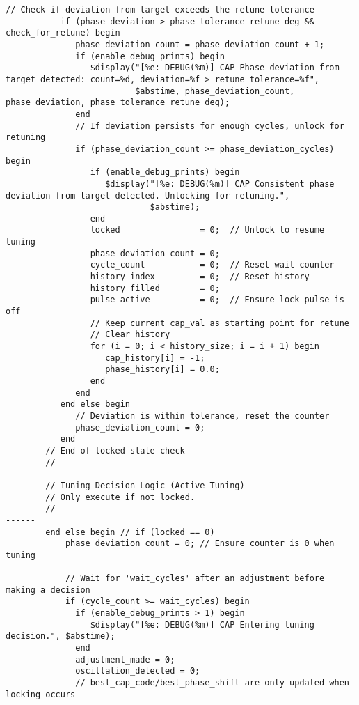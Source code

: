 \begin{lstlisting}[caption={Verilog-A Generic Capacitor Tuner Implementation}]
           // Check if deviation from target exceeds the retune tolerance
           if (phase_deviation > phase_tolerance_retune_deg && check_for_retune) begin
              phase_deviation_count = phase_deviation_count + 1;
              if (enable_debug_prints) begin
                 $display("[%e: DEBUG(%m)] CAP Phase deviation from target detected: count=%d, deviation=%f > retune_tolerance=%f",
                          $abstime, phase_deviation_count, phase_deviation, phase_tolerance_retune_deg);
              end
              // If deviation persists for enough cycles, unlock for retuning
              if (phase_deviation_count >= phase_deviation_cycles) begin
                 if (enable_debug_prints) begin
                    $display("[%e: DEBUG(%m)] CAP Consistent phase deviation from target detected. Unlocking for retuning.",
                             $abstime);
                 end
                 locked                = 0;  // Unlock to resume tuning
                 phase_deviation_count = 0;
                 cycle_count           = 0;  // Reset wait counter
                 history_index         = 0;  // Reset history
                 history_filled        = 0;
                 pulse_active          = 0;  // Ensure lock pulse is off
                 // Keep current cap_val as starting point for retune
                 // Clear history
                 for (i = 0; i < history_size; i = i + 1) begin
                    cap_history[i] = -1;
                    phase_history[i] = 0.0;
                 end
              end
           end else begin
              // Deviation is within tolerance, reset the counter
              phase_deviation_count = 0;
           end
        // End of locked state check
        //------------------------------------------------------------------
        // Tuning Decision Logic (Active Tuning)
        // Only execute if not locked.
        //------------------------------------------------------------------
        end else begin // if (locked == 0)
            phase_deviation_count = 0; // Ensure counter is 0 when tuning

            // Wait for 'wait_cycles' after an adjustment before making a decision
            if (cycle_count >= wait_cycles) begin
              if (enable_debug_prints > 1) begin
                 $display("[%e: DEBUG(%m)] CAP Entering tuning decision.", $abstime);
              end
              adjustment_made = 0;
              oscillation_detected = 0;
              // best_cap_code/best_phase_shift are only updated when locking occurs


\end{lstlisting}
